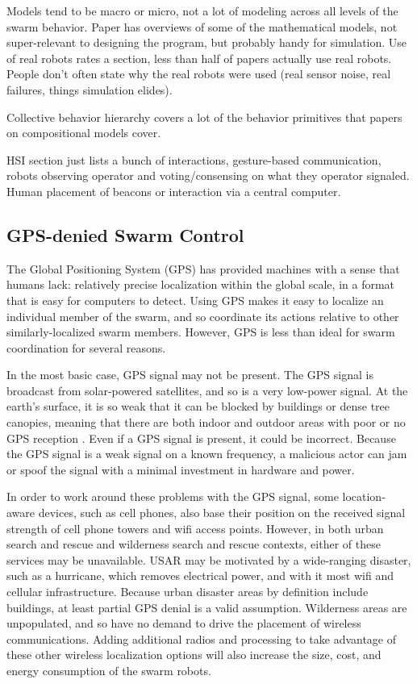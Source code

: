 \documentclass[]{article}
\begin{document}
Models tend to be macro or micro, not a lot of modeling across all levels of the swarm behavior. Paper has overviews of some of the mathematical models, not super-relevant to designing the program, but probably handy for simulation. Use of real robots rates a section, less than half of papers actually use real robots. People don't often state why the real robots were used (real sensor noise, real failures, things simulation elides). 

Collective behavior hierarchy covers a lot of the behavior primitives that papers on compositional models cover. 

HSI section just lists a bunch of interactions, gesture-based communication, robots observing operator and voting/consensing on what they operator signaled. Human placement of beacons or interaction via a central computer. 




\subsection{GPS-denied Swarm Control}

The Global Positioning System (GPS) has provided machines with a sense that humans lack: relatively precise localization within the global scale, in a format that is easy for computers to detect.
Using GPS makes it easy to localize an individual member of the swarm, and so coordinate its actions relative to other similarly-localized swarm members. 
However, GPS is less than ideal for swarm coordination for several reasons. 

In the most basic case, GPS signal may not be present. 
The GPS signal is broadcast from solar-powered satellites, and so is a very low-power signal.
At the earth's surface, it is so weak that it can be blocked by buildings or dense tree canopies, meaning that there are both indoor and outdoor areas with poor or no GPS reception \cite{zheng2005quantitative}. 
Even if a GPS signal is present, it could be incorrect. 
Because the GPS signal is a weak signal on a known frequency, a malicious actor can jam or spoof the signal with a minimal investment in hardware and power\cite{montgomery2009receiver}.

In order to work around these problems with the GPS signal, some location-aware devices, such as cell phones, also base their position on the received signal strength of cell phone towers and wifi access points. 
However, in both urban search and rescue and wilderness search and rescue contexts, either of these services may be unavailable. 
USAR may be motivated by a wide-ranging disaster, such as a hurricane, which removes electrical power, and with it most wifi and cellular infrastructure.
Because urban disaster areas by definition include buildings, at least partial GPS denial is a valid assumption.  
Wilderness areas are unpopulated, and so have no demand to drive the placement of wireless communications. 
Adding additional radios and processing to take advantage of these other wireless localization options will also increase the size, cost, and energy consumption of the swarm robots.
\end{document}
